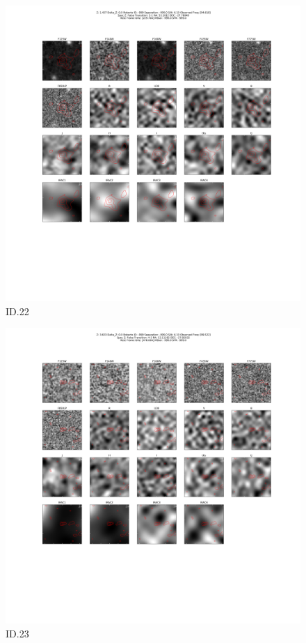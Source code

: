 \begin{figure}[tbp]
\centering \includegraphics[width=120mm]{Matched/ASPECS_Cutout_22.png}
\caption{ID.22}
\label{fig:Match_Three}
\end{figure}

\begin{figure}[tbp]
\centering \includegraphics[width=120mm]{Matched/ASPECS_Cutout_23.png}
\caption{ID.23}
\label{fig:Match_Three}
\end{figure}

